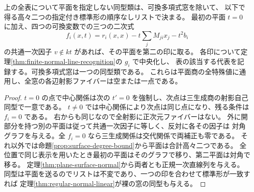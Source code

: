 \begin{theorem}\label{thm:plane-quotient-unmarked}
上の全表について平面を指定しない同型類は、可換多項式窓を除いて、
以下で得る高々二つの指定付き標準形の順序なしリストで決まる。
最初の平面 $t=0$ に加え、四つの可換変数での三つの二次式
\[
 f_i(x,t)=r_i(x,x)-t\sum_j M_{ji}x_j-t^2b_i
\]
の共通一次因子 $v\notin kt$ があれば、その平面を第二の印に取る。
各印について定理\ref{thm:finite-normal-line-recognition}の $g_i$ で中央化し、
表の該当する代表を記録する。可換多項式窓は一つの同型類である。
これらは平面商の全特殊値に通用し、全窓の各辺射影ファイバーは空または一点である。
\end{theorem}
\begin{proof}
$t=0$ の点で中心関係は次の $t'=0$ を強制し、次点は三生成商の射影自己同型で一意である。
$t\ne0$ では中心関係により次点は同じ点になり、残る条件は $f_i=0$ である。
右からも同じなので全射影に正次元ファイバーはない。
外に開部分を持つ別の平面は従って共通一次因子に等しく、反対に各その因子は
対角グラフを与える。全 $f_i=0$ なら三生成関係は交代関係で両補正も零である。
それ以外では命題\ref{prop:surface-degree-bound}から平面は合計高々二つである。
全位置で同じ表示を用いたとき最初の平面はそのグラフで移り、第二平面は対角で移る。
定理\ref{thm:plane-surface-normal}から両者とも正規一次直線列を与える。
同型は平面を送るのでリストは不変であり、一つの印を合わせて標準形が一致すれば
定理\ref{thm:regular-normal-linear}が裸の窓の同型も与える。
\end{proof}
